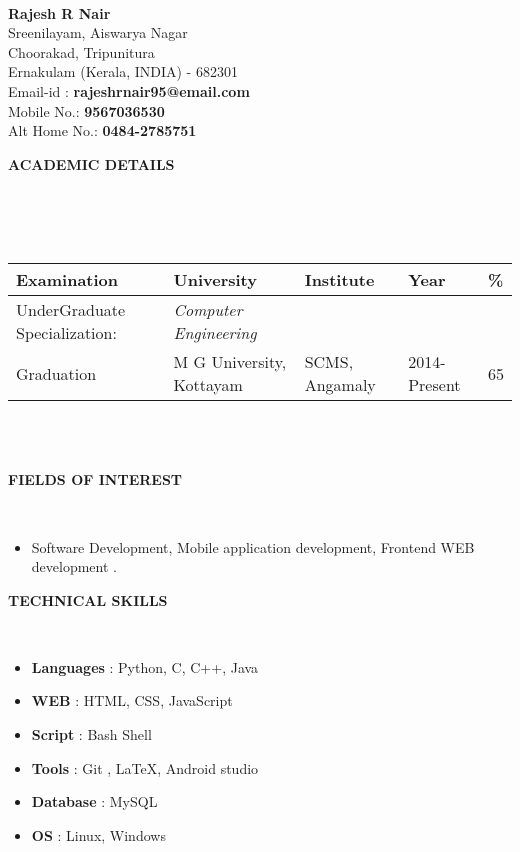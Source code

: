 \documentclass[a4paper,10pt]{article}
\newcommand{\lsep}{-0.5cm}
\newcommand{\resheading}[1]{{\small \colorbox{mygrey}{\begin{minipage}{0.975\textwidth}{\textbf{#1 \vphantom{p\^{E}}}}\end{minipage}}}}
\begin{document}
\hspace{0.5cm}\\[-0.2cm]

\textbf{Rajesh R Nair} \\
\indent Sreenilayam, Aiswarya Nagar \\
\indent Choorakad, Tripunitura  \\
\indent Ernakulam (Kerala, INDIA) - 682301\\
\indent Email-id : \textbf{rajeshrnair95@email.com} \\
\indent Mobile No.: \textbf{9567036530} \\
\indent Alt Home No.: \textbf{0484-2785751} \\

\resheading{\textbf{ACADEMIC DETAILS} }\\[\lsep]
\\ \\
\indent \begin{tabular}{ l @{\hskip 0.15in} l @{\hskip 0.15in} l @{\hskip 0.15in} l @{\hskip 0.15in} l }
\hline
\textbf{Examination} & \textbf{University} & \textbf{Institute} & \textbf{Year} & \textbf{\%} \\
\hline
UnderGraduate Specialization: & \textit{Computer Engineering} \\
Graduation & M G University, Kottayam & SCMS, Angamaly & 2014-Present & 65\\
\hline
\end{tabular}
\\ \\

\resheading{\textbf{FIELDS OF INTEREST} }\\[\lsep]
\begin{itemize}
\item \noindent Software Development, Mobile application development, Frontend WEB development .
\end{itemize}

\resheading{\textbf{TECHNICAL SKILLS} }\\[\lsep]
\begin{itemize}
\item \noindent  \textbf{Languages} : Python, C, C++, Java
\item  \textbf{WEB} : HTML, CSS, JavaScript
\item  \textbf{Script} : Bash Shell
\item  \textbf{Tools} : Git , \LaTeX , Android studio
\item \textbf{Database} : MySQL
\item  \textbf{OS} : Linux, Windows
\end{itemize}
\end{document}
